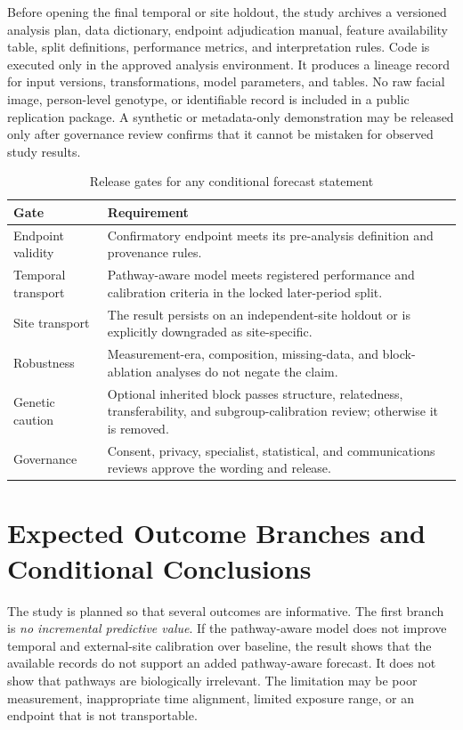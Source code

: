 \documentclass[conference]{IEEEtran}
\begin{document}
Before opening the final temporal or site holdout, the study archives a
versioned analysis plan, data dictionary, endpoint adjudication manual,
feature availability table, split definitions, performance metrics, and
interpretation rules. Code is executed only in the approved analysis
environment. It produces a lineage record for input versions, transformations,
model parameters, and tables. No raw facial image, person-level genotype, or
identifiable record is included in a public replication package. A synthetic
or metadata-only demonstration may be released only after governance review
confirms that it cannot be mistaken for observed study results.

\begin{table}[t]
\caption{Release gates for any conditional forecast statement}
\label{tab:gates}
\centering
\footnotesize
\begin{tabular}{p{}p{}}
\toprule
Gate & Requirement \\
\midrule
Endpoint validity & Confirmatory endpoint meets its pre-analysis definition and provenance rules. \\
Temporal transport & Pathway-aware model meets registered performance and calibration criteria in the locked later-period split. \\
Site transport & The result persists on an independent-site holdout or is explicitly downgraded as site-specific. \\
Robustness & Measurement-era, composition, missing-data, and block-ablation analyses do not negate the claim. \\
Genetic caution & Optional inherited block passes structure, relatedness, transferability, and subgroup-calibration review; otherwise it is removed. \\
Governance & Consent, privacy, specialist, statistical, and communications reviews approve the wording and release. \\
\bottomrule
\end{tabular}
\end{table}

\section{Expected Outcome Branches and Conditional Conclusions}

The study is planned so that several outcomes are informative. The first
branch is \emph{no incremental predictive value}. If the pathway-aware model
does not improve temporal and external-site calibration over baseline, the
result shows that the available records do not support an added pathway-aware
forecast. It does not show that pathways are biologically irrelevant. The
limitation may be poor measurement, inappropriate time alignment, limited
exposure range, or an endpoint that is not transportable.
\end{document}
